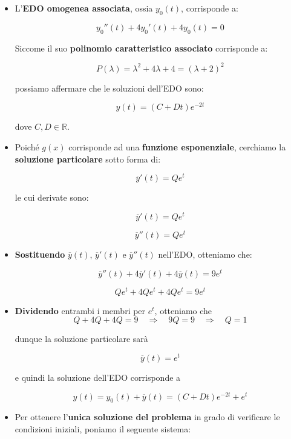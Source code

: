 \documentclass[a4paper, 12pt]{report}
\begin{document}
\begin{itemize}
\begin{itemize}
            \item L'\textbf{EDO omogenea associata}, ossia $y_0(t)$, corrisponde a:
            
            \[ y_0''(t)+4y_0'(t)+4y_0(t)=0\]
            
            Siccome il suo \textbf{polinomio caratteristico associato} corrisponde a:
            
            \[ P(\lambda) = \lambda^2+4\lambda+4 = (\lambda+2)^2\]
        
            possiamo affermare che le soluzioni dell'EDO sono:
            
            \[ y(t) = (C+Dt)e^{-2t}\]
            
            dove $C, D \in \mathbb{R}$.
            
            \item Poiché $g(x)$ corrisponde ad una \textbf{funzione esponenziale}, cerchiamo la \textbf{soluzione particolare} sotto forma di:
            
            \[ \overline{y}'(t) = Qe^{t}\]
            
            le cui derivate sono:
            
            \[ \overline{y}'(t) = Qe^{t}\]
            
            \[ \overline{y}''(t) = Qe^{t}\]
            
            \item \textbf{Sostituendo} $\overline{y}(t)$, $\overline{y}'(t)$ e $\overline{y}''(t)$ nell'EDO, otteniamo che:
            
            \[ \overline{y}''(t)+4\overline{y}'(t)+4\overline{y}(t)=9e^t\]
            
            \[ Qe^{t}+4Qe^{t}+4Qe^{t}=9e^t\]
            
            \item \textbf{Dividendo}  entrambi i membri per $e^t$, otteniamo che
            \[ Q+4Q+4Q=9 \quad \Longrightarrow \quad 9Q = 9 \quad \Longrightarrow \quad Q = 1\]
            
            dunque la soluzione particolare sarà
            
            \[ \overline{y}(t) = e^t\]
            
            e quindi la soluzione dell'EDO corrisponde a
            
            \[ y(t) = y_0(t) + \overline{y}(t) = (C+Dt)e^{-2t}+e^t\]
            
            \item Per ottenere l'\textbf{unica soluzione del problema} in grado di verificare le condizioni iniziali, poniamo il seguente sistema:
            

\end{itemize}
\end{itemize}
\end{document}
